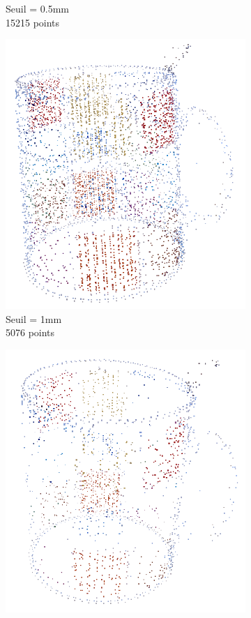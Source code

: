\documentclass[a4paper,10pt]{report}
\begin{document}
\begin{figure}[h!]
\begin{subfigure}[b]{0.3\textwidth}
        \caption{Seuil = 0.5mm\\15215 points}
    \end{subfigure}
    \begin{subfigure}[b]{0.3\textwidth}
	    \includegraphics[width=\textwidth]{results/dp1-pointcloud.png}
        \caption{Seuil = 1mm\\5076 points}
    \end{subfigure}
    \begin{subfigure}[b]{0.3\textwidth}
	    \includegraphics[width=\textwidth]{results/defaults-pointcloud.png}

\end{subfigure}
\end{figure}
\end{document}
